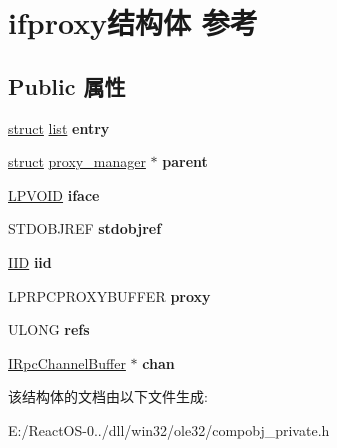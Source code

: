 \hypertarget{structifproxy}{}\section{ifproxy结构体 参考}
\label{structifproxy}
\subsection*{Public 属性}
\begin{DoxyCompactItemize}
\item 
\mbox{\label{structifproxy_acba1030af10eb4f3d7a263c612fd0ee7}} 
\hyperlink{interfacestruct}{struct} \hyperlink{classlist}{list} {\bfseries entry}
\item 
\mbox{\label{structifproxy_a4b6f6c1b9f654b30d2dcc31a1919c731}} 
\hyperlink{interfacestruct}{struct} \hyperlink{structproxy__manager}{proxy\+\_\+manager} $\ast$ {\bfseries parent}
\item 
\mbox{\label{structifproxy_ac0e7f3a663afd4b1692831642f89694d}} 
\hyperlink{interfacevoid}{L\+P\+V\+O\+ID} {\bfseries iface}
\item 
\mbox{\label{structifproxy_ac0de8a66e032737afbf5f464b713871d}} 
S\+T\+D\+O\+B\+J\+R\+EF {\bfseries stdobjref}
\item 
\mbox{\label{structifproxy_a15b165e2807f0c581a5256067b7738df}} 
\hyperlink{struct___i_i_d}{I\+ID} {\bfseries iid}
\item 
\mbox{\label{structifproxy_ad43f9571a958d0d36784f8c79ba34447}} 
L\+P\+R\+P\+C\+P\+R\+O\+X\+Y\+B\+U\+F\+F\+ER {\bfseries proxy}
\item 
\mbox{\label{structifproxy_aa81303aced8577ea021a84a68fca42c6}} 
U\+L\+O\+NG {\bfseries refs}
\item 
\mbox{\label{structifproxy_a475b2095a29f65f3ee8d3641f642db44}} 
\hyperlink{interface_i_rpc_channel_buffer}{I\+Rpc\+Channel\+Buffer} $\ast$ {\bfseries chan}
\end{DoxyCompactItemize}


该结构体的文档由以下文件生成\+:\begin{DoxyCompactItemize}
\item 
E\+:/\+React\+O\+S-\/0../dll/win32/ole32/compobj\+\_\+private.\+h\end{DoxyCompactItemize}
